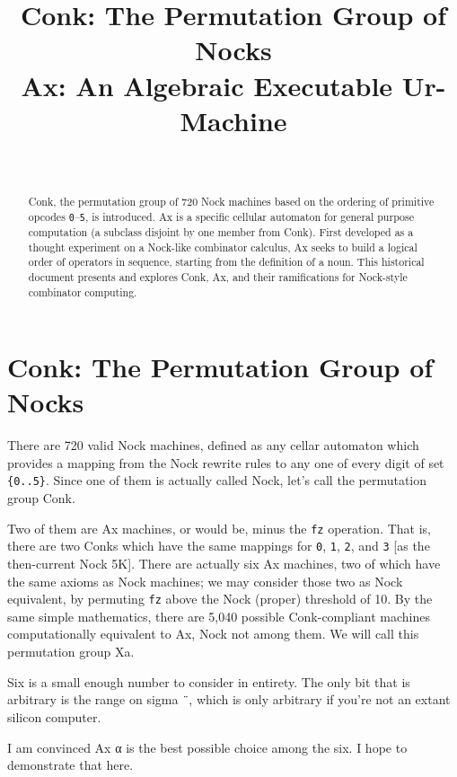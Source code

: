 \documentclass[twoside]{article}
\title{Conk:  The Permutation 
Group of Nocks \\ Ax:  An Algebraic Executable Ur-Machine}
\author{\authorname~\authorpatp \\ \affiliation}
\date{}
\begin{document}
\maketitle
\thispagestyle{firststyle}

\begin{abstract}
Conk, the permutation group of 720 Nock machines based on the ordering of primitive opcodes \texttt{0}--\texttt{5}, is introduced.  Ax is a specific cellular automaton for general purpose computation (a subclass disjoint by one member from Conk).  First developed as a thought experiment on a Nock-like combinator calculus, Ax seeks to build a logical order of operators in sequence, starting from the definition of a noun.  This historical document presents and explores Conk, Ax, and their ramifications for Nock-style combinator computing.
\end{abstract}

\setcounter{page}{189}

\tableofcontents

\section{Conk:  The Permutation Group of Nocks}

There are 720 valid Nock machines, defined as any cellar auto\-maton which provides a mapping from the Nock rewrite rules to any one of every digit of set \texttt{\{0..5\}}. Since one of them is actually called Nock, let's call the permutation group Conk.

Two of them are Ax machines, or would be, minus the \texttt{fz} operation. That is, there are two Conks which have the same mappings for \texttt{0}, \texttt{1}, \texttt{2}, and \texttt{3} [as the then-current Nock 5K]. There are actually six Ax machines, two of which have the same axioms as Nock machines; we may consider those two as Nock equivalent, by permuting \texttt{fz} above the Nock (proper) threshold of 10. By the same simple mathematics, there are 5,040 possible Conk-compliant machines computationally equivalent to Ax, Nock not among them. We will call this permutation group Xa. %

Six is a small enough number to consider in entirety. The only bit that is arbitrary is the range on sigma \texttt{¨}, which is only arbitrary if you're not an extant silicon computer.

I am convinced Ax α is the best possible choice among the six. I hope to demonstrate that here.
\end{document}
